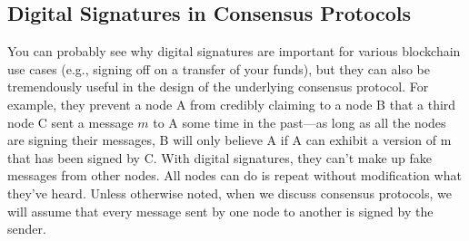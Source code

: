 \subsection{Digital Signatures in Consensus Protocols}
You can probably see why digital signatures are important for various blockchain use cases
(e.g., signing off on a transfer of your funds), but they can also be tremendously useful in
the design of the underlying consensus protocol. For example, they prevent a node A from
credibly claiming to a node B that a third node C sent a message $m$ to A some time in
the past—as long as all the nodes are signing their messages, B will only believe A if A can
exhibit a version of m that has been signed by C. With digital signatures, they can’t make
up fake messages from other nodes. All nodes can do is repeat without modification what
they’ve heard. Unless otherwise noted, when we discuss consensus protocols, we will assume
that every message sent by one node to another is signed by the sender.

